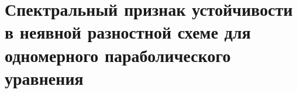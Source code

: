 \documentclass[__main__.tex]{subfiles}
\begin{document}
\section{Спектральный признак устойчивости в неявной разностной схеме для одномерного параболического уравнения}
\end{document}
